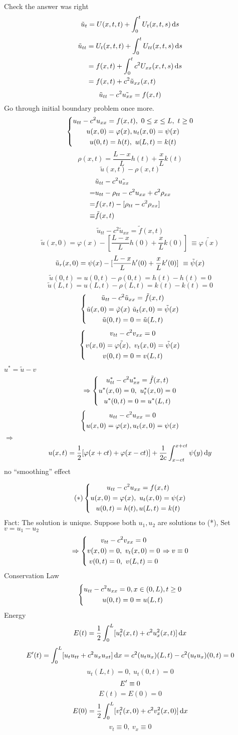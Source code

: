 Check the answer was right
\[\tilde{u}_t=U(x,t,t)+\int_0^tU_t(x,t,s)\,\mathrm{d} s
\]
\[\begin{aligned}\tilde{u}_{tt}&=U_t(x,t,t)+\int_0^tU_{tt}(x,t,s)\,\mathrm{d} s\\
&=f(x,t)+\int_0^tc^2U_{xx}(x,t,s)\,\mathrm{d} s\\
&=f(x,t)+c^2\tilde{u}_{xx}(x,t)
\end{aligned}
\]
\[\tilde{u}_{tt}-c^2\tilde{u_{xx}}=f(x,t)
\]
Go through initial boundary problem once more.
\[\left\{\begin{gathered}u_{tt}-c^2u_{xx}=f(x,t),~0\leq x\leq L,~t\geq0\\u(x,0)=\varphi(x), u_t(x,0)=\psi(x)\\u(0,t)=h(t),~u(L,t)=k(t)\end{gathered}\right.
\]
\[\rho(x,t)=\frac{L-x}{L}h(t)+\frac{x}{L}k(t)
\]
\[\tilde{u}(x,t)-\rho(x,t)
\]
\[\begin{aligned}&\tilde{u}_{tt}-c^2\tilde{u_{xx}}\\
=&u_{tt}-\rho_{tt}-c^2u_{xx}+c^2\rho_{xx}\\
=&f(x,t)-[\rho_{tt}-c^2\rho_{xx}]\\
\equiv&\tilde{f}(x,t)
\end{aligned}
\]
\text{\red \%\%\%\%\%}
\[\tilde{u}_{tt}-c^2\tilde{u}_{xx}=\tilde{f}(x,t)
\]
\[\tilde{u}(x,0)=\varphi(x)-[\frac{L-x}{L}h(0)+\frac{x}{L}k(0)]~\equiv\tilde{\varphi(x)}
\]
\[\tilde{u}_r(x,0)=\psi(x)-[\frac{L-x}{L}h^{\prime}(0)+\frac{x}{L}k^{\prime}(0)]~\equiv\tilde{\psi}(x)
\]
\text{\red \%\%\%\%\%}
\[\tilde{u}(0,t)=u(0,t)-\rho(0,t)=h(t)-h(t)=0
\]
\[\tilde{u}(L,t)=u(L,t)-\rho(L,t)=k(t)-k(t)=0
\]
\[\left\{\begin{gathered}\tilde{u}_{tt}-c^2\tilde{u}_{xx}=\tilde{f}(x,t)\\\tilde{u}(x,0)=\tilde{\varphi}(x)~ \tilde{u}_t(x,0)=\tilde{\psi}(x)\\\tilde{u}(0,t)=0=\tilde{u}(L,t)\end{gathered}\right.
\]
\[\left\{\begin{gathered}v_{tt}-c^2v_{xx}=0\\v(x,0)=\tilde{\varphi(x)},~v_t(x,0)=\tilde{\psi}(x)\\v(0,t)=0=v(L,t)\end{gathered}\right.
\]
$u^*=\tilde{u}-v$
\[\Rightarrow\left\{\begin{gathered}u^*_{tt}-c^2u^*_{xx}=\tilde{f}(x,t)\\u^*(x,0)=0,~u^*_t(x,0)=0\\u^*(0,t)=0=u^*(L,t)\end{gathered}\right.
\]
\text{\red \%\%\%\%\%}
\[\left\{\begin{gathered}u_{tt}-c^2u_{xx}=0\\u(x,0)=\varphi(x), u_t(x,0)=\psi(x)\end{gathered}\right.
\]
$\Rightarrow$
\[u(x,t)=\frac{1}{2}[\varphi(x+ct)+\varphi(x-ct)]+\frac{1}{2c}\int_{x-ct}^{x+ct}\psi(y)\,\mathrm{d} y
\]
no ``smoothing'' effect

\text{\red \%\%\%\%\%}
\[(*)\left\{\begin{gathered}u_{tt}-c^2u_{xx}=f(x,t)\\u(x,0)=\varphi(x),~u_t(x,0)=\psi(x)\\u(0,t)=h(t), u(L,t)=k(t)\end{gathered}\right.
\]
Fact: The solution is unique. Suppose both $u_1, u_2$ are solutions to (*), Set $v=u_1-u_2$\\
\[\Rightarrow \left\{\begin{gathered}v_{tt}-c^2v_{xx}=0\\v(x,0)=0,~v_t(x,0)=0\\v(0,t)=0,~v(L,t)=0\end{gathered}\right.\Rightarrow v\equiv0
\]
Conservation Law
\[\left\{\begin{gathered}u_{tt}-c^2u_{xx}=0, x\in(0,L), t\geq0\\u(0,t)=0=u(L,t)\end{gathered}\right.
\]
Energy
\[E(t)=\frac{1}{2}\int_0^L[u_t^2(x,t)+c^2u_x^2(x,t)]\,\mathrm{d} x
\]
\[E^{\prime}(t)=\int_0^L[u_tu_{tt}+c^2u_x u_{xt}]\,\mathrm{d} x=c^2(u_tu_x)(L,t)-c^2(u_tu_x)(0,t)=0
\]
\[u_t(L,t)=0,~u_t(0,t)=0
\]
\[E^{\prime}\equiv0
\]
\[E(t)=E(0)=0
\]
\[E(0)=\frac{1}{2}\int_0^L[v_t^2(x,0)+c^2v_x^2(x,0)]\,\mathrm{d} x
\]
\[v_t\equiv0,~v_x\equiv0
\]




